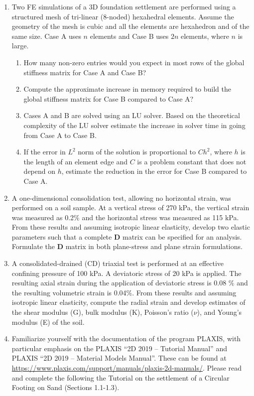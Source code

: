 \documentclass[a4paper,12pt]{article}
\begin{document}
 
\begin{enumerate}
	\item Two FE simulations of a 3D foundation settlement are performed using a structured mesh of tri-linear (8-noded) hexahedral elements. Assume the geometry of the mesh is cubic and all the elements are hexahedron and of the same size. Case A uses $n$ elements and Case B uses $2n$ elements, where $n$ is large.
	\begin{enumerate}
		\item How many non-zero entries would you expect in most rows of the global stiffness matrix for Case A and Case B?
		\item Compute the approximate increase in memory required to build the global stiffness matrix for Case B compared to Case A?
		\item Cases A and B are solved using an LU solver. Based on the theoretical complexity of the LU solver estimate the increase in solver time in going from Case A to Case B.
		\item If the error in $L^2$ norm of the solution is proportional to $Ch^2$, where $h$ is the length of an element edge and $C$ is a problem constant that does not depend on $h$, estimate the reduction in the error for Case B compared to Case A.
	\end{enumerate}

	\item A one-dimensional consolidation test, allowing no horizontal strain, was performed on a soil sample. At a vertical stress of 270 kPa, the vertical strain was measured as 0.2\% and the horizontal stress was measured as 115 kPa. From these results and assuming isotropic linear elasticity, develop two elastic parameters such that a complete \textbf{D} matrix can be specified for an analysis. Formulate the \textbf{D} matrix in both plane-stress and plane strain formulations.

	\item A consolidated-drained (CD) triaxial test is performed at an effective confining pressure of 100 kPa. A deviatoric stress of 20 kPa is applied. The resulting axial strain during the application of deviatoric stress is 0.08 \% and the resulting volumetric strain is 0.04\%. From these results and assuming isotropic linear elasticity, compute the radial strain and develop estimates of the shear modulus (G), bulk modulus (K), Poisson's ratio ($\nu$), and Young's modulus (E) of the soil.

	\item Familiarize yourself with the documentation of the program PLAXIS, with particular emphasis on the PLAXIS “2D 2019 – Tutorial Manual” and PLAXIS “2D 2019 – Material Models Manual”.  These can be found at \url{https://www.plaxis.com/support/manuals/plaxis-2d-manuals/}.  Please read and complete the following the Tutorial on the settlement of a Circular Footing on Sand (Sections 1.1-1.3).
	

\end{enumerate}
\end{document}

